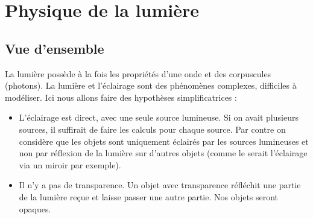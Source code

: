 \documentclass[11pt,class=report,crop=false]{standalone}
\begin{document}
\newcommand{\Cl}{\operatorname{\it Cl}}












\section{Physique de la lumière}

\subsection{Vue d'ensemble}

La lumière possède à la fois les propriétés d'une onde et des corpuscules (photons). La lumière et l'éclairage sont des phénomènes complexes, difficiles à modéliser. Ici nous allons faire des hypothèses simplificatrices :
\begin{itemize}
  \item L'éclairage est direct, avec une seule source lumineuse. Si on avait plusieurs sources, il suffirait de faire les calculs pour chaque source. Par contre on considère que les objets sont uniquement éclairés par les sources lumineuses et non par réflexion de la lumière sur d'autres objets (comme le serait l'éclairage via un miroir par exemple).

  \item Il n'y a pas de transparence. Un objet avec transparence réfléchit une partie de la lumière reçue et laisse passer une autre partie. Nos objets seront opaques.

\end{itemize}
\end{document}
